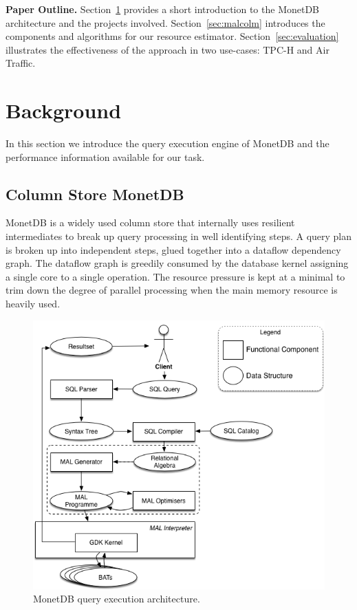 \documentclass[conference]{IEEEtran}
\def\Skip{\par\medskip\nobreak\noindent}
\begin{document}
\Skip
\textbf{Paper Outline.}
Section~\ref{sec:background} provides a short introduction to the MonetDB architecture and the projects involved.
Section~\ref{sec:malcolm} introduces the components and algorithms for our resource estimator.
Section~\ref{sec:evaluation} illustrates the effectiveness of the approach in two use-cases: TPC-H and Air Traffic.

\section{Background}
\label{sec:background} 
In this section we introduce the query execution engine of MonetDB and the performance information available for our task.

\subsection{Column Store MonetDB}
MonetDB is a widely used column store that internally uses resilient intermediates to break up query processing in well identifying steps. 
A query plan is broken up into independent steps, glued together into a dataflow dependency graph.
The dataflow graph is greedily consumed by the database kernel assigning a single core to a single operation.
The resource pressure is kept at a minimal to trim down the degree of parallel processing when the main memory resource is heavily used.
\begin{figure}[t]
    \centering\includegraphics[width=.95\columnwidth]{Figures/MDB_impl_arch.png}
    \caption{MonetDB query execution architecture.}
    \label{fig:mdb_arch}
\end{figure}
\end{document}

